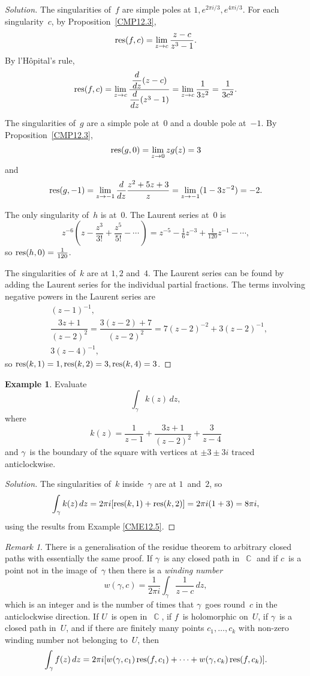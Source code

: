 \documentclass{amsproc}
\theoremstyle{definition}
\newtheorem{example}[theorem]{Example}
\newenvironment{solution}{\begin{proof}[Solution]}{\end{proof}}
\theoremstyle{remark}
\newtheorem{remark}[theorem]{Remark}
\DeclareMathOperator{\C}{\mathbb{C}}
\DeclareMathOperator{\res}{\textup{res}}
\numberwithin{equation}{section}
\begin{document}
\begin{solution}
The singularities of~$ f $ are simple poles at $ 1, e^{2\pi i/3}, e^{4\pi i/3} $. For each singularity~$ c $, by Proposition~\ref{CMP12.3},
$$
\res(f,c) = \lim_{z \to c} \dfrac{z - c}{z^3 - 1}.
$$
By l'H\^opital's rule,
$$
\res(f,c) = \lim_{z \to c} \dfrac{\dfrac{d}{dz}(z - c)}{\dfrac{d}{dz}(z^3 - 1)} = \lim_{z \to c} \dfrac{1}{3z^2} = \dfrac{1}{3c^2}.
$$

The singularities of~$ g $ are a simple pole at~$ 0 $ and a double pole at~$ -1 $. By Proposition~\ref{CMP12.3},
$$
\res(g,0) = \lim_{z \to 0} zg(z) = 3
$$
and
$$
\res(g,-1) = \lim_{z \to -1} \dfrac{d}{dz} \dfrac{z^2 + 5z + 3}{z} = \lim_{z \to -1}(1 - 3z^{-2}) = -2.
$$

The only singularity of~$ h $ is at~$ 0 $. The Laurent series at~$ 0 $ is
$$
z^{-6}\left(z - \dfrac{z^3}{3!} + \dfrac{z^5}{5!} - \cdots\,\right) = z^{-5} - \tfrac{1}{6} z^{-3} + \tfrac{1}{120} z^{-1} - \cdots,
$$
so $ \res(h,0) = \tfrac{1}{120} $.

The singularities of~$ k $ are at $ 1,2 $ and~$ 4 $. The Laurent series can be found by adding the Laurent series for the individual partial fractions. The terms involving
negative powers in the Laurent series are
\begin{align*}
&(z - 1)^{-1}, \\
&\dfrac{3z + 1}{(z - 2)^2} = \dfrac{3(z - 2) + 7}{(z - 2)^2} = 7(z - 2)^{-2} + 3(z - 2)^{-1}, \\
&3(z - 4)^{-1},
\end{align*}
so $ \res(k,1) = 1, \res(k,2) = 3, \res(k,4) = 3 $.
\end{solution}

\begin{example} \label{CME12.6}
Evaluate
$$
\int_\gamma k(z)\,dz,
$$
where
$$
k(z) = \dfrac{1}{z - 1} + \dfrac{3z + 1}{(z - 2)^2} + \dfrac{3}{z - 4}
$$
and $ \gamma $~is the boundary of the square with vertices at $ \pm 3 \pm 3i $ traced anticlockwise.
\end{example}

\begin{solution}
The singularities of~$ k $ inside~$ \gamma $ are at $ 1 $~and~$ 2 $, so
$$
\int_\gamma k(z)\,dz = 2\pi i[\res(k,1) + \res(k,2)] = 2\pi i(1 + 3) = 8\pi i,
$$
using the results from Example \ref{CME12.5}.
\end{solution}

\begin{remark} \label{CMR12.7}
There is a generalisation of the residue theorem to arbitrary closed paths with essentially the same proof. If $ \gamma $~is any closed path in~$ \C $ and if $ c $~is a point
not in the image of~$ \gamma $ then there is a \emph{winding number}
$$
w(\gamma,c) = \dfrac{1}{2\pi i} \int_\gamma \dfrac{1}{z - c}\,dz,
$$
which is an integer and is the number of times that $ \gamma $~goes round~$ c $ in the  anticlockwise direction. If $ U $~is open in~$ \C $, if $ f $~is holomorphic on~$ U $,
if $ \gamma $~is a closed path in~$ U $, and if there are finitely many points $ c_1, \dots, c_k $ with non-zero winding number not belonging to~$ U $, then
$$
\int_\gamma f(z)\,dz = 2\pi i[w(\gamma,c_1)\res(f,c_1) + \cdots + w(\gamma,c_k)\res(f,c_k)].
$$
\end{remark}
\end{document}
